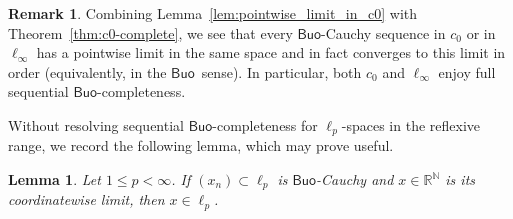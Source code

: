 \documentclass[11pt]{amsart}
\newtheorem{lemma}[theorem]{Lemma}
\theoremstyle{definition}
\newtheorem{remark}[theorem]{Remark}
\newcommand{\R}{\mathbb{R}}
\newcommand{\N}{\mathbb{N}}
\newcommand{\Buo}{\ensuremath{\mathsf{Buo}}}
\renewcommand{\le}{\leqslant}
\begin{document}
\begin{remark}\label{rem:c0-linfty-open}
Combining Lemma~\ref{lem:pointwise_limit_in_c0} with
Theorem~\ref{thm:c0-complete}, we see that every \Buo-Cauchy sequence in
$c_0$ or in $\ell_\infty$ has a pointwise limit in the same space and in
fact converges to this limit in order (equivalently, in the \Buo\ sense).
In particular, both $c_0$ and $\ell_\infty$ enjoy full sequential
\Buo-completeness.
\end{remark}

Without resolving sequential \Buo-completeness for $\ell_p$-spaces in the reflexive range, we record the following lemma, which may prove useful.

\begin{lemma}\label{lem:pointwise_limit_in_ellp}
Let $1\le p<\infty$. If $(x_n)\subset \ell_p$ is \Buo-Cauchy and $x\in\R^\N$ is its coordinatewise limit, then $x\in \ell_p$.
\end{lemma}
\end{document}
